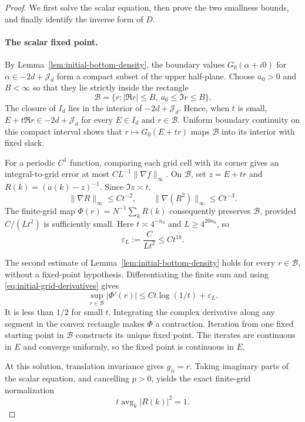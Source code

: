 \begin{proof}
We first solve the scalar equation, then prove the two smallness bounds,
and finally identify the inverse form of $D$.

\paragraph{The scalar fixed point.}
By Lemma~\ref{lem:initial-bottom-density}, the boundary values
$G_0(\alpha+i0)$ for $\alpha\in-2d+\mathcal J_d$ form a compact subset
of the upper half-plane. Choose $a_0>0$ and $B<\infty$ so that they lie
strictly inside the rectangle
\[
 \mathcal B=\{r:|\Re r|\le B,\ a_0\le\Im r\le B\}.
\]
The closure of $I_d$ lies in the interior of $-2d+\mathcal J_d$.
Hence, when $t$ is small, $E+t\Re r\in-2d+\mathcal J_d$ for every
$E\in I_d$ and $r\in\mathcal B$. Uniform boundary continuity on this
compact interval shows that $r\mapsto G_0(E+tr)$ maps $\mathcal B$
into its interior with fixed slack.

For a periodic $C^1$ function, comparing each grid cell with its corner
gives an integral-to-grid error at most $CL^{-1}\|\nabla f\|_\infty$.
On $\mathcal B$, set $z=E+tr$ and $R(k)=(a(k)-z)^{-1}$.
Since $\Im z\asymp t$,
\begin{equation}\label{eq:initial-grid-derivatives}
 \|\nabla R\|_\infty\le Ct^{-2},\qquad
 \|\nabla(R^2)\|_\infty\le Ct^{-3}.
\end{equation}
The finite-grid map
$\Phi(r)=N^{-1}\sum_kR(k)$ consequently preserves $\mathcal B$,
provided $C/(Lt^2)$ is sufficiently small.  Here
$t\asymp4^{-n_0}$ and $L\ge4^{20n_0}$, so
\begin{equation}\label{eq:initial-grid-error}
 \varepsilon_L:=\frac{C}{Lt^2}\le Ct^{18}.
\end{equation}

The second estimate of Lemma~\ref{lem:initial-bottom-density} holds for
every $r\in\mathcal B$, without a fixed-point hypothesis.  Differentiating
the finite sum and using \eqref{eq:initial-grid-derivatives} gives
\[
 \sup_{r\in\mathcal B}|\Phi'(r)|
 \le Ct\log(1/t)+\varepsilon_L.
\]
It is less than $1/2$ for small $t$.  Integrating the complex derivative
along any segment in the convex rectangle makes $\Phi$ a contraction.
Iteration from one fixed starting point in $\mathcal B$ constructs its unique
fixed point.  The iterates are continuous in $E$ and converge uniformly,
so the fixed point is continuous in $E$.

At this solution, translation invariance gives $g_{ii}=r$.  Taking
imaginary parts of the scalar equation, and cancelling $p>0$, yields
the exact finite-grid normalization
\begin{equation}\label{eq:initial-normalization}
 t\operatorname{avg}_k|R(k)|^2=1.
\end{equation}


\end{proof}
